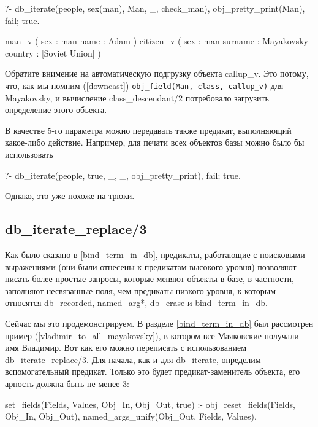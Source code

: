 \documentclass[a4paper]{book}
\def\na{named\_arg*}
\begin{document}
\begin{example}{}{}
?- db_iterate(people, sex(man), Man, _, check_man), 
   obj_pretty_print(Man), fail; true.

man_v ( 
  sex : man 
  name : Adam 
) 
citizen_v ( 
  sex : man 
  surname : Mayakovsky 
  country : [Soviet Union] 
) 
\end{example}

Обратите внимение на автоматическую подгрузку объекта
callup_v. Это потому, что, как мы помним (\ref{downcast})
\verb|obj_field(Man, class, callup_v)| для Mayakovsky, и
вычисление class_descendant/2 потребовало загрузить определение
этого объекта.

В качестве 5-го параметра можно передавать также предикат,
выполняющий какое-либо действие. Например, для печати всех
объектов базы можно было бы использовать

\begin{example}{}{}
?- db_iterate(people, true, _, _, obj_pretty_print), fail; true.
\end{example}

Однако, это уже похоже на трюки.

\subsection{db_iterate_replace/3}
\label{db_iterate_replace/3}

Как было сказано в \ref{bind_term_in_db}, предикаты, работающие с
поисковыми выражениями (они были отнесены к предикатам высокого
уровня) позволяют писать более простые запросы, которые меняют
объекты в базе, в частности, заполняют несвязанные поля, чем
предикаты низкого уровня, к которым относятся db_recorded, \na,
db_erase и bind_term_in_db.

Сейчас мы это продемонстрируем. В разделе \ref{bind_term_in_db}
был рассмотрен пример (\ref{vladimir_to_all_mayakovsky}), в
котором все Маяковские получали имя Владимир. Вот как его можно
переписать с использованием db_iterate_replace/3. Для начала, как
и для db_iterate, определим вспомогательный предикат. Только это
будет предикат-заменитель объекта, его арность должна быть не
менее 3:

\begin{example}{}{}
set_fields(Fields, Values, Obj_In, Obj_Out, true) :- 
   obj_reset_fields(Fields, Obj_In, Obj_Out), 
   named_args_unify(Obj_Out, Fields, Values). 
\end{example}
\end{document}

